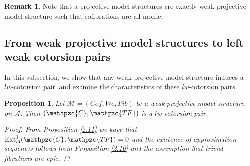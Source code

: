 \documentclass[12pt]{amsart}
\numberwithin{equation}{section}
\newtheorem{proposition}[lemma]{Proposition}
\theoremstyle{definition}
\newtheorem{remark}[lemma]{Remark}
\DeclareMathOperator{\Ext}{Ext}
\newtheorem*{theorem 0*}{Theorem}
\newtheorem*{theorem a*}{Theorem A}
\newtheorem*{theorem b*}{Theorem B}
\numberwithin{diagram}{section}
\begin{document}
\begin{remark}\label{3.3}
Note that a projective model structures are exactly weak projective model structure such that cofibrations are all monic.
\end{remark}

\subsection{From weak projective model structures to left weak cotorsion pairs}
In this subsection, we show that any weak projective model structure induces a $lw$-cotorsion pair, and examine the characteristics of these $lw$-cotorsion pairs.

\begin{proposition}\label{3.4}
   Let $\mathcal{M}=(Cof,We,Fib)$ be a weak projective model structure on $\mathcal{A}$. Then $(\mathpzc{C},\mathpzc{TF})$ is a $lw$-cotorsion pair.
   \begin{proof}
   From Proposition \ref{2.11} we have that $\Ext_{\mathcal{A}}^1(\mathpzc{C},\mathpzc{TF})=0$ and the existence of approximation sequences follows from Proposition \ref{2.10} and the assumption that trivial fibrations are epic.
   \end{proof}
   \end{proposition}  
	
\end{document}
